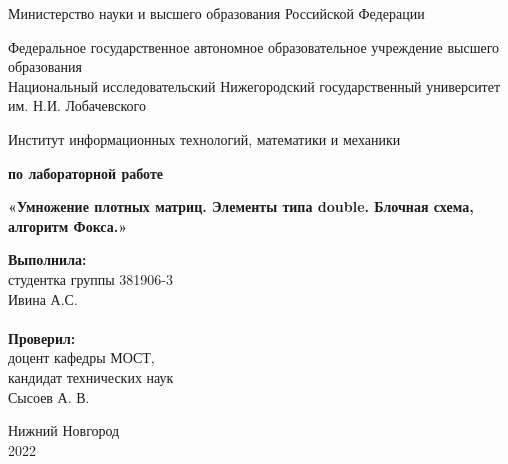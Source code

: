 \documentclass{report}
\begin{document}
\begin{titlepage}

\begin{center}
Министерство науки и высшего образования Российской Федерации
\end{center}

\begin{center}
Федеральное государственное автономное образовательное учреждение высшего образования \\
Национальный исследовательский Нижегородский государственный университет им. Н.И. Лобачевского
\end{center}

\begin{center}
Институт информационных технологий, математики и механики
\end{center}

\vspace{4em}

\begin{center}
\textbf{ по лабораторной работе} \\
\end{center}
\begin{center}
\textbf{\Large«Умножение плотных матриц. Элементы типа double. Блочная схема, алгоритм Фокса.»} \\
\end{center}

\vspace{4em}

\newbox{\lbox}
\newlength{\maxl}
\setlength{\maxl}{\wd\lbox}
\hfill\parbox{7cm}{
\hspace*{5cm}\hspace*{-5cm}\textbf{Выполнила:} \\ студентка группы 381906-3 \\ Ивина А.С. \\
\\
\hspace*{5cm}\hspace*{-5cm}\textbf{Проверил:}\\ доцент кафедры МОСТ, \\ кандидат технических наук \\ Сысоев А. В.\\
}
\vspace{\fill}

\begin{center} Нижний Новгород \\ 2022 \end{center}

\end{titlepage}
\end{document}
